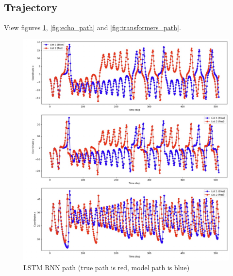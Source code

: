 \documentclass[11pt]{article}
\begin{document}
\subsection{Trajectory}
View figures \ref{fig:rnn_path}, \ref{fig:echo_path} and \ref{fig:transformers_path}.
\begin{figure}
    \centering
    \begin{minipage}[b]{0.49\textwidth}
        \includegraphics[width=\linewidth]{rnn_path.jpeg}
        \caption{LSTM RNN path (true path is red, model path is blue)}
        \label{fig:rnn_path}
    \end{minipage}
    \hfill
    \begin{minipage}[b]{0.49\textwidth}

\end{minipage}
\end{figure}
\end{document}
